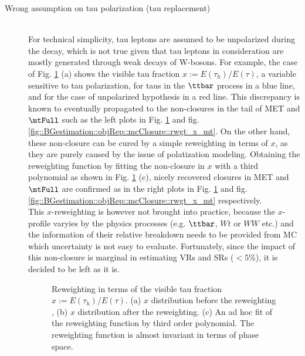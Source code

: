 \begin{description}
\item [Wrong assumption on tau polarization (tau replacement)] \mbox{} \\
For technical simplicity, tau leptons are assumed to be unpolarized during the decay, which is not true given that tau leptons in consideration are mostly generated through weak decays of W-bosons. For example, the case of Fig. \ref{fig::BGestimation::objRep::mcClosure::rwgt_x} (a) shows the visible tau fraction $x := E(\tau_{h})/E(\tau)$, a variable sensitive to tau polarization, for taus in the $\ttbar$ process in a blue line, and for the case of unpolarized hypothesis in a red line. This discrepancy is known to eventually propagated to the non-closures in the tail of MET and $\mtFull$ such as the left plots in Fig. \ref{fig::BGestimation::objRep::mcClosure::rwgt_x} and fig. \ref{fig::BGestimation::objRep::mcClosure::rwgt_x_mt}. On the other hand, these non-closure can be cured by a simple reweighting in terms of $x$, as they are purely caused by the issue of polatization modeling. Obtaining the reweighting function by fitting the non-closure in $x$ with a third polynomial as shown in Fig. \ref{fig::BGestimation::objRep::mcClosure::rwgt_x} (c), nicely recovered closures in MET and $\mtFull$ are confirmed as in the right plots in Fig. \ref{fig::BGestimation::objRep::mcClosure::rwgt_x} and fig. \ref{fig::BGestimation::objRep::mcClosure::rwgt_x_mt} respectively.  \\

This $x$-reweighting is however not brought into practice, because the $x$-profile varyies by the physics processes (e.g. $\ttbar$, $Wt$ or $WW$ etc.) and the information of their relative breakdown needs to be provided from MC which uncertainty is not easy to evaluate.
Fortunately, since the impact of this non-closure is marginal in estimating VRs and SRs ($<5\%$), it is decided to be left as it is.

\begin{figure}[h]
  \centering
    \caption{Reweighting in terms of the visible tau fraction $x := E(\tau_{h})/E(\tau)$. (a) $x$ distribution before the reweighting , (b) $x$ distribution after the reweighting. (c) An ad hoc fit of the reweighting function by third order polynomial. The reweighting function is almost invariant in terms of phase space.  \label{fig::BGestimation::objRep::mcClosure::rwgt_x} }
\end{figure}


\end{description}
